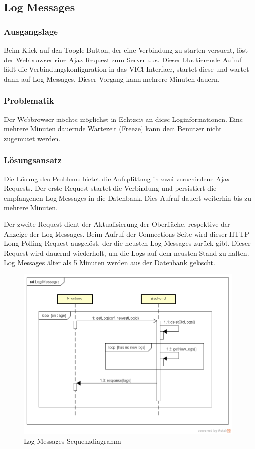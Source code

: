 \newpage
\subsection{Log Messages}
\subsubsection{Ausgangslage}
Beim Klick auf den Toogle Button, der eine Verbindung zu starten versucht, löst der Webbrowser eine Ajax Request zum Server aus. Dieser blockierende Aufruf lädt die Verbindungskonfiguration in das VICI Interface, startet diese und wartet dann auf Log Messages. Dieser Vorgang kann mehrere Minuten dauern.


\subsubsection{Problematik}
Der Webbrowser möchte möglichst in Echtzeit an diese Loginformationen. Eine mehrere Minuten dauernde Wartezeit (Freeze) kann dem Benutzer nicht zugemutet werden.

\subsubsection{Lösungsansatz}
Die Lösung des Problems bietet die Aufsplittung in zwei verschiedene Ajax Requests. Der erste Request startet die Verbindung und persistiert die empfangenen Log Messages in die Datenbank. Dies Aufruf dauert weiterhin bis zu mehrere Minuten.

Der zweite Request dient der Aktualisierung der Oberfläche, respektive der Anzeige der Log Messages.
Beim Aufruf der Connections Seite wird dieser HTTP Long Polling Request ausgelöst, der die neusten Log Messages zurück gibt. Dieser Request wird dauernd wiederholt, um die Logs auf dem neusten Stand zu halten. Log Messages älter als 5 Minuten werden aus der Datenbank gelöscht. \\
\begin{figure}[H]
\centering
\includegraphics[width=360pt]{images/log_messages_seq.png}
\caption[Log Messages Sequenzdiagramm]{Log Messages Sequenzdiagramm}
\end{figure}